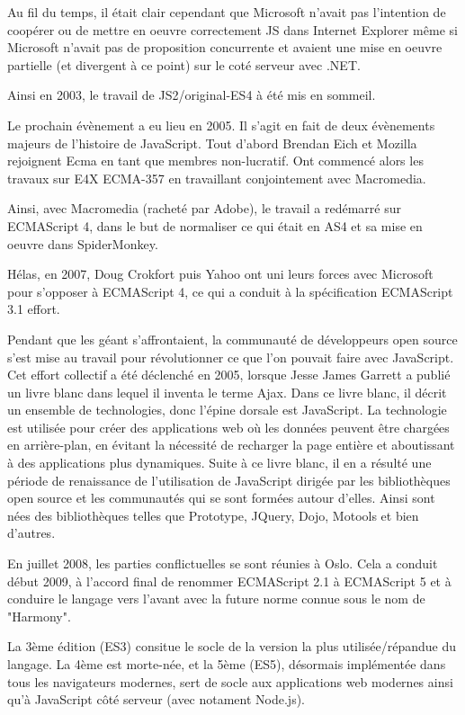 Au fil du temps, il était clair cependant que Microsoft n’avait pas l’intention de coopérer ou de mettre en oeuvre correctement JS dans Internet Explorer même si Microsoft n’avait pas de proposition concurrente et avaient une mise en oeuvre partielle (et divergent à ce point) sur le coté serveur avec .NET.

Ainsi en 2003, le travail de JS2/original-ES4 à été mis en sommeil.

Le prochain évènement a eu lieu en 2005. Il s’agit en fait de deux évènements majeurs de l’histoire de JavaScript. Tout d’abord Brendan Eich et Mozilla rejoignent Ecma en tant que membres non-lucratif. Ont commencé alors les travaux sur E4X ECMA-357 en travaillant conjointement avec Macromedia.

Ainsi, avec Macromedia (racheté par Adobe), le travail a redémarré sur ECMAScript 4, dans le but de normaliser ce qui était en AS4 et sa mise en oeuvre dans SpiderMonkey.

Hélas, en 2007, Doug Crokfort puis Yahoo ont uni leurs forces avec Microsoft pour s’opposer à ECMAScript 4, ce qui a conduit à la spécification ECMAScript 3.1 effort.

Pendant que les géant s’affrontaient, la communauté de développeurs open source s’est mise au travail pour révolutionner ce que l’on pouvait faire avec JavaScript. Cet effort collectif a été déclenché en 2005, lorsque Jesse James Garrett a publié un livre blanc dans lequel il inventa le terme Ajax. Dans ce livre blanc, il décrit un ensemble de technologies, donc l’épine dorsale est JavaScript. La technologie est utilisée pour créer des applications web où les données peuvent être chargées en arrière-plan, en évitant la nécessité de recharger la page entière et aboutissant à des applications plus dynamiques. Suite à ce livre blanc, il en a résulté une période de renaissance de l’utilisation de JavaScript dirigée par les bibliothèques open source et les communautés qui se sont formées autour d’elles. Ainsi sont nées des bibliothèques telles que Prototype, JQuery, Dojo, Motools et bien d’autres.

En juillet 2008, les parties conflictuelles se sont réunies à Oslo. Cela a conduit début 2009, à l’accord final de renommer ECMAScript 2.1 à ECMAScript 5 et à conduire le langage vers l’avant avec la future norme connue sous le nom de "Harmony".


La 3ème édition (ES3) consitue le socle de la version la plus utilisée/répandue du langage. La 4ème est morte-née, et la 5ème (ES5), désormais implémentée dans tous les navigateurs modernes, sert de socle aux applications web modernes ainsi qu’à JavaScript côté serveur (avec notament Node.js).

